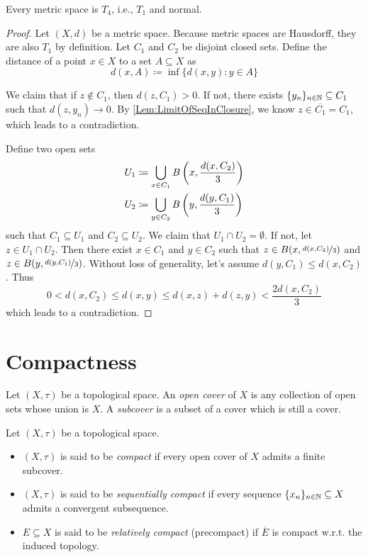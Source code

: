 \documentclass[screen,single]{techreport}
\numberwithin{equation}{section}
\begin{document}
\begin{proposition}\label{Prop:MetricT4}
	Every metric space is $T_4$, i.e., $T_1$ and normal.
\end{proposition}
\begin{proof}
	Let $(X,d)$ be a metric space.
	Because metric spaces are Hausdorff, they are also $T_1$ by definition.
	Let $C_1$ and $C_2$ be disjoint closed sets.
	Define the distance of a point $x \in X$ to a set $A \subseteq X$ as
	\[
	d(x,A) \coloneqq \inf \{ d(x,y) : y \in A \}
	\]
	
	We claim that if $z \not\in C_1$, then $d(z,C_1) > 0$.
	If not, there exists $\{y_n\}_{n \in \mathbb{N}} \subseteq C_1$ such that $d(z,y_n) \rightarrow 0$.
	By \cref{Lem:LimitOfSeqInClosure}, we know $z \in \overline{C_1} = C_1$, which leads to a contradiction.
	
	Define two open sets
	\begin{align*}
		U_1 & \coloneqq \bigcup_{x \in C_1} B\left({x,\frac{d(x,C_2)}{3}}\right) \\
		U_2 & \coloneqq \bigcup_{y \in C_2} B\left({y,\frac{d(y,C_1)}{3}}\right)
	\end{align*}
	such that $C_1 \subseteq U_1$ and $C_2 \subseteq U_2$.
	We claim that $U_1 \cap U_2 = \emptyset$.
	If not, let $z \in U_1 \cap U_2$.
	Then there exist $x \in C_1$ and $y \in C_2$ such that $z \in B(x,\nicefrac{d(x,C_2)}{3})$ and $z \in B(y,\nicefrac{d(y,C_1)}{3})$.
	Without loss of generality, let's assume $d(y,C_1) \le d(x,C_2)$.
	Thus
	\[
	0 < d(x,C_2) \le d(x,y) \le d(x,z)+d(z,y) < \frac{2d(x,C_2)}{3}
	\]
	which leads to a contradiction.
\end{proof}

\section{Compactness}

\begin{definition}\label{De:Covers}
	Let $(X,\tau)$ be a topological space.
	An \emph{open cover} of $X$ is any collection of open sets whose union is $X$.
	A \emph{subcover} is a subset of a cover which is still a cover.
\end{definition}

\begin{definition}\label{De:CompactSpace}
	Let $(X,\tau)$ be a topological space.
	\begin{itemize}
		\item $(X,\tau)$ is said to be \emph{compact} if every open cover of $X$ admits a finite subcover.
		\item $(X,\tau)$ is said to be \emph{sequentially compact} if every sequence $\{x_n\}_{n \in \mathbb{N}} \subseteq X$ admits a convergent subsequence.
		\item $E \subseteq X$ is said to be \emph{relatively compact} (precompact) if $\overline{E}$ is compact w.r.t. the induced topology.
	\end{itemize}
\end{definition}
\end{document}
